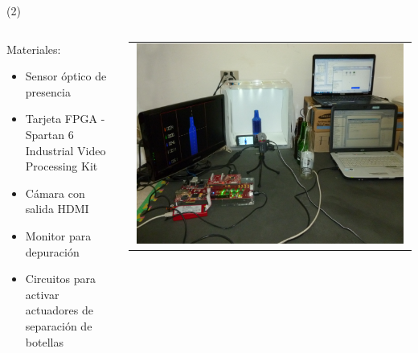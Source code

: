 \begin{frame}{ (2)}
\begin{columns}
\begin{column}{0.5\textwidth}

Materiales:
\begin{itemize}
        \item Sensor óptico de presencia
        \item Tarjeta FPGA - Spartan 6 Industrial Video Processing Kit
        \item Cámara con salida HDMI
        \item Monitor para depuración
        \item Circuitos para activar actuadores de separación de botellas
	\end{itemize}
\end{column}
\begin{column}{0.5\textwidth}  
\begin{center}
     \begin{tabular}{c}
         \includegraphics[width=0.98\textwidth]{2022_BottleClassifier/figs/cap4_setup.png}\\
          \end{tabular}
\end{center}
\end{column} 
\end{columns} 
\end{frame}


